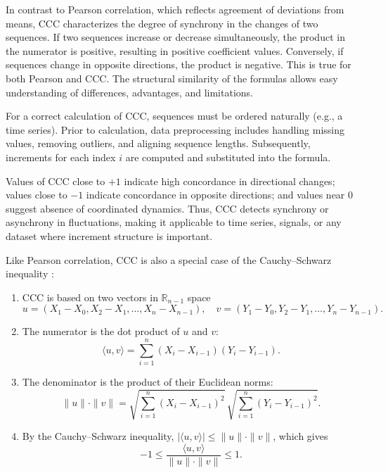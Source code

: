 \documentclass[aos]{imsart}
\begin{document}
In contrast to Pearson correlation, which reflects agreement of deviations from means, CCC characterizes the degree of synchrony in the changes of two sequences. If two sequences increase or decrease simultaneously, the product in the numerator is positive, resulting in positive coefficient values. Conversely, if sequences change in opposite directions, the product is negative. This is true for both Pearson and CCC. The structural similarity of the formulas allows easy understanding of differences, advantages, and limitations.  

For a correct calculation of CCC, sequences must be ordered naturally (e.g., a time series). Prior to calculation, data preprocessing includes handling missing values, removing outliers, and aligning sequence lengths. Subsequently, increments for each index $i$ are computed and substituted into the formula.

Values of CCC close to $+1$ indicate high concordance in directional changes; values close to $-1$ indicate concordance in opposite directions; and values near $0$ suggest absence of coordinated dynamics. Thus, CCC detects synchrony or asynchrony in fluctuations, making it applicable to time series, signals, or any dataset where increment structure is important.

Like Pearson correlation, CCC is also a special case of the Cauchy–Schwarz inequality \cite{r3}:
\begin{enumerate}
\item CCC is based on two vectors in $\mathbb{R}_{n-1}$ space
\[
u = (X_1-X_0, X_2-X_1, \dots, X_n-X_{n-1}), \quad
v = (Y_1-Y_0, Y_2-Y_1, \dots, Y_n-Y_{n-1}).
\]
\item The numerator is the dot product of $u$ and $v$:
\[
\langle u,v \rangle = \sum_{i=1}^n (X_i - X_{i-1})(Y_i - Y_{i-1}).
\]
\item The denominator is the product of their Euclidean norms:
\[
\|u\| \cdot \|v\| = \sqrt{\sum_{i=1}^n (X_i - X_{i-1})^2} \, \sqrt{\sum_{i=1}^n (Y_i - Y_{i-1})^2}.
\]
\item By the Cauchy–Schwarz inequality, $|\langle u,v \rangle| \le \|u\|\cdot \|v\|$, which gives
\[
-1 \le \frac{\langle u,v \rangle}{\|u\|\cdot \|v\|} \le 1.
\]
\end{enumerate}
\end{document}
